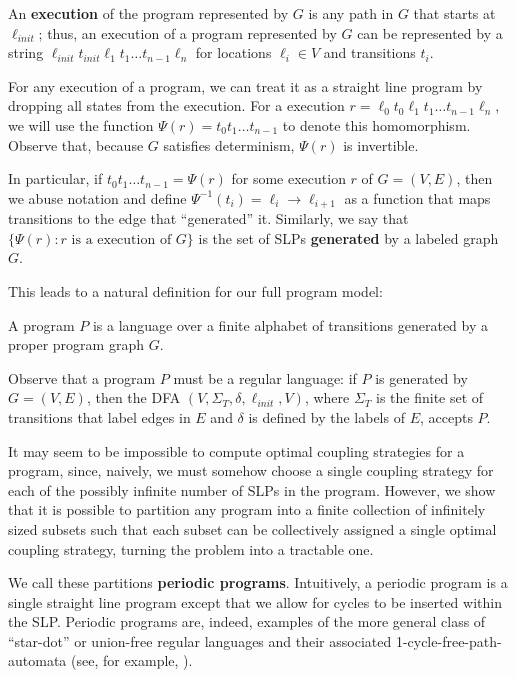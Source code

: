 An \textbf{execution} of the program represented by $G$ is any path in $G$ that starts at $\ell_{init}$; thus, an execution of a program represented by $G$ can be represented by a string $\ell_{init}t_{init}\ell_1t_1\ldots t_{n-1}\ell_n$ for locations $\ell_i\in V$ and transitions $t_i$.

For any execution of a program, we can treat it as a straight line program by dropping all states from the execution. For a execution $r=\ell_0t_0\ell_1t_1\ldots t_{n-1}\ell_n$, we will use the function $\Psi(r) = t_0t_1\ldots t_{n-1}$ to denote this homomorphism. Observe that, because $G$ satisfies determinism, $\Psi(r)$ is invertible. 

In particular, if $t_0t_1\ldots t_{n-1} = \Psi(r)$ for some execution $r$ of $G = (V, E)$, then we abuse notation and define $\Psi^{-1}(t_i) = \ell_i\to\ell_{i+1}$ as a function that maps transitions to the edge that ``generated'' it. Similarly, we say that $\{\Psi(r): r\text{ is a execution of }G\}$ is the set of SLPs \textbf{generated} by a labeled graph $G$. 

This leads to a natural definition for our full program model: 
\begin{defn}[Programs]
    A program $P$ is a language over a finite alphabet of transitions generated by a proper program graph $G$.
\end{defn}

Observe that a program $P$ must be a regular language: if $P$ is generated by $G = (V, E)$, then the DFA $(V, \Sigma_T, \delta, \ell_{init}, V)$, where $\Sigma_T$ is the finite set of transitions that label edges in $E$ and $\delta$ is defined by the labels of $E$, accepts $P$.

It may seem to be impossible to compute optimal coupling strategies for a program, since, naively, we must somehow choose a single coupling strategy for each of the possibly infinite number of SLPs in the program. However, we show that it is possible to partition any program into a finite collection of infinitely sized subsets such that each subset can be collectively assigned a single optimal coupling strategy, turning the problem into a tractable one.

We call these partitions \textbf{periodic programs}.
Intuitively, a periodic program is a single straight line program except that we allow for cycles to be inserted within the SLP. Periodic programs are, indeed, examples of the more general class of ``star-dot'' or union-free regular languages and their associated 1-cycle-free-path-automata (see, for example, \cite{nagyUnionfreeRegularLanguages2006}).

